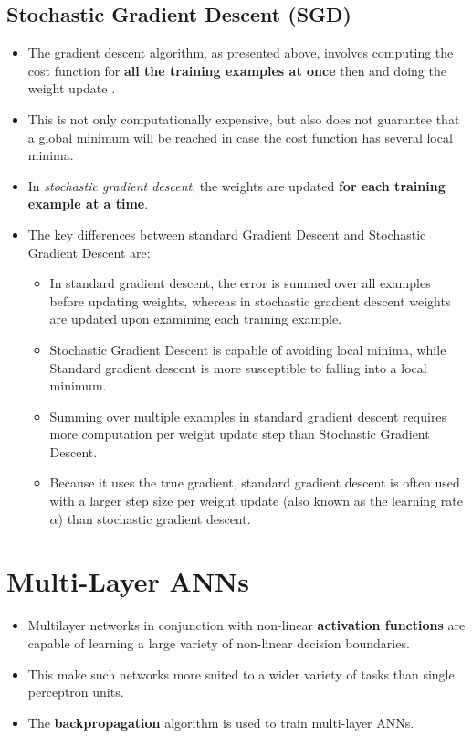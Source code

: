 \documentclass{article}
\theoremstyle{plain}
\theoremstyle{definition}
\begin{document}
\subsection{Stochastic Gradient Descent (SGD)}
\begin{itemize}
    \item The gradient descent algorithm, as presented above, involves computing the cost function for \textbf{all the training examples at once} then and doing the weight update . 
    
    \item This is not only computationally expensive, but also does not guarantee that a global minimum will be reached in case the cost function has several local minima. 
    
    \item In \textit{stochastic gradient descent}, the weights are updated \textbf{for each training example at a time}. 
    
    \item The key differences between standard Gradient Descent and Stochastic Gradient Descent are:
    
    \begin{itemize}
        \item In standard gradient descent, the error is summed over all examples before updating weights, whereas in stochastic gradient descent weights are updated upon examining each training example.
        
        \item Stochastic Gradient Descent is capable of avoiding local minima, while Standard gradient descent is more susceptible to falling into a local minimum. 
        
        \item Summing over multiple examples in standard gradient descent requires more computation per weight update step than Stochastic Gradient Descent. 
        
        \item Because it uses the true gradient, standard gradient descent is often used with a larger step size per weight update (also known as the learning rate $\alpha$) than stochastic gradient descent.
    \end{itemize}
\end{itemize}

\section{Multi-Layer ANNs}
\begin{itemize}
    \item Multilayer networks in conjunction with non-linear \textbf{activation functions} are capable of learning a large variety of non-linear decision boundaries. 
    
    \item This make such networks more suited to a wider variety of tasks than single perceptron units. 
    
    \item The \textbf{backpropagation} algorithm is used to train multi-layer ANNs.
\end{itemize}
\end{document}
